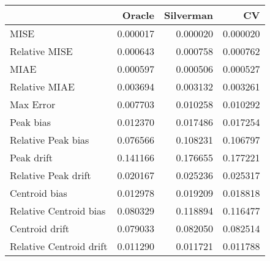 \begin{tabular}{lrrr}
  \hline
 & Oracle & Silverman & CV \\ 
  \hline
MISE & 0.000017 & 0.000020 & 0.000020 \\ 
  Relative MISE & 0.000643 & 0.000758 & 0.000762 \\ 
  MIAE & 0.000597 & 0.000506 & 0.000527 \\ 
  Relative MIAE & 0.003694 & 0.003132 & 0.003261 \\ 
  Max Error & 0.007703 & 0.010258 & 0.010292 \\ 
  Peak bias & 0.012370 & 0.017486 & 0.017254 \\ 
  Relative Peak bias & 0.076566 & 0.108231 & 0.106797 \\ 
  Peak drift & 0.141166 & 0.176655 & 0.177221 \\ 
  Relative Peak drift & 0.020167 & 0.025236 & 0.025317 \\ 
  Centroid bias & 0.012978 & 0.019209 & 0.018818 \\ 
  Relative Centroid bias & 0.080329 & 0.118894 & 0.116477 \\ 
  Centroid drift & 0.079033 & 0.082050 & 0.082514 \\ 
  Relative Centroid drift & 0.011290 & 0.011721 & 0.011788 \\ 
   \hline
\end{tabular}
